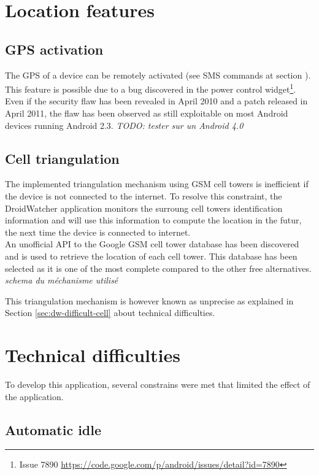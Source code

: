 \section{Location features}

\subsection{GPS activation}

The GPS of a device can be remotely activated (see SMS commands at section \label{sec:dw-smscom}).
This feature is possible due to a bug discovered in the power control widget\footnote{Issue 7890 \url{https://code.google.com/p/android/issues/detail?id=7890}}.
Even if the security flaw has been revealed in April 2010 and a patch released in April 2011, the flaw has been observed as still exploitable on most Android devices running Android 2.3.
\emph{TODO: tester sur un Android 4.0}

\subsection{Cell triangulation}
The implemented triangulation mechanism using GSM cell towers is inefficient if the device is not connected to the internet.
To resolve this constraint, the DroidWatcher application monitors the surroung cell towers identification information and will use this information to compute the location in the futur, the next time the device is connected to internet.\\

An unofficial API to the Google GSM cell tower database has been discovered and is used to retrieve the location of each cell tower.
This database has been selected as it is one of the most complete compared to the other free alternatives.\\

\emph{schema du méchanisme utilisé}

This triangulation mechanism is however known as unprecise as explained in Section \ref{sec:dw-difficult-cell} about technical difficulties.

\section{Technical difficulties}

To develop this application, several constrains were met that limited the effect of the application.

\subsection{Automatic idle}

